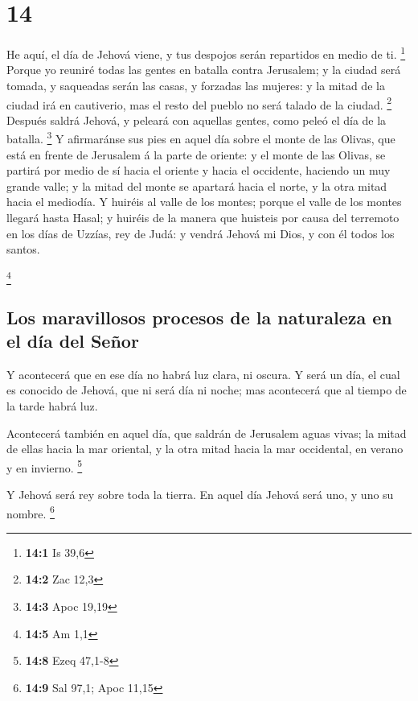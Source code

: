 \hypertarget{section-13}{%
\section{14}\label{section-13}}

 He aquí, el día de Jehová viene, y tus despojos serán
repartidos en medio de ti. \footnote{\textbf{14:1} Is 39,6}
 Porque yo reuniré todas las gentes en batalla contra
Jerusalem; y la ciudad será tomada, y saqueadas serán las casas, y
forzadas las mujeres: y la mitad de la ciudad irá en cautiverio, mas el
resto del pueblo no será talado de la ciudad. \footnote{\textbf{14:2}
  Zac 12,3}  Después saldrá Jehová, y peleará con aquellas
gentes, como peleó el día de la batalla. \footnote{\textbf{14:3} Apoc
  19,19}  Y afirmaránse sus pies en aquel día sobre el
monte de las Olivas, que está en frente de Jerusalem á la parte de
oriente: y el monte de las Olivas, se partirá por medio de sí hacia el
oriente y hacia el occidente, haciendo un muy grande valle; y la mitad
del monte se apartará hacia el norte, y la otra mitad hacia el mediodía.
 Y huiréis al valle de los montes; porque el valle de los
montes llegará hasta Hasal; y huiréis de la manera que huisteis por
causa del terremoto en los días de Uzzías, rey de Judá: y vendrá Jehová
mi Dios, y con él todos los santos.

\footnote{\textbf{14:5} Am 1,1}

\hypertarget{los-maravillosos-procesos-de-la-naturaleza-en-el-duxeda-del-seuxf1or}{%
\subsection{Los maravillosos procesos de la naturaleza en el día del
Señor}\label{los-maravillosos-procesos-de-la-naturaleza-en-el-duxeda-del-seuxf1or}}

 Y acontecerá que en ese día no habrá luz clara, ni
oscura.  Y será un día, el cual es conocido de Jehová, que
ni será día ni noche; mas acontecerá que al tiempo de la tarde habrá
luz.

 Acontecerá también en aquel día, que saldrán de Jerusalem
aguas vivas; la mitad de ellas hacia la mar oriental, y la otra mitad
hacia la mar occidental, en verano y en invierno. \footnote{\textbf{14:8}
  Ezeq 47,1-8}

 Y Jehová será rey sobre toda la tierra. En aquel día
Jehová será uno, y uno su nombre. \footnote{\textbf{14:9} Sal 97,1; Apoc
  11,15}

